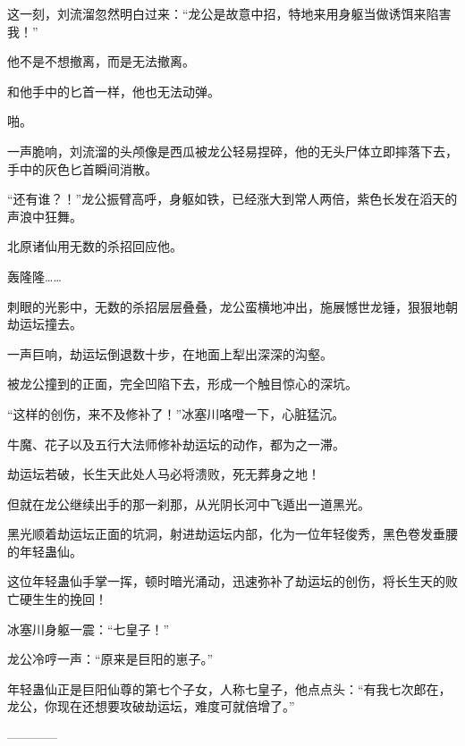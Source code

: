 \begin{this_body}
这一刻，刘流溜忽然明白过来：“龙公是故意中招，特地来用身躯当做诱饵来陷害我！”

他不是不想撤离，而是无法撤离。

和他手中的匕首一样，他也无法动弹。

啪。

一声脆响，刘流溜的头颅像是西瓜被龙公轻易捏碎，他的无头尸体立即摔落下去，手中的灰色匕首瞬间消散。

“还有谁？！”龙公振臂高呼，身躯如铁，已经涨大到常人两倍，紫色长发在滔天的声浪中狂舞。

北原诸仙用无数的杀招回应他。

轰隆隆……

刺眼的光影中，无数的杀招层层叠叠，龙公蛮横地冲出，施展憾世龙锤，狠狠地朝劫运坛撞去。

一声巨响，劫运坛倒退数十步，在地面上犁出深深的沟壑。

被龙公撞到的正面，完全凹陷下去，形成一个触目惊心的深坑。

“这样的创伤，来不及修补了！”冰塞川咯噔一下，心脏猛沉。

牛魔、花子以及五行大法师修补劫运坛的动作，都为之一滞。

劫运坛若破，长生天此处人马必将溃败，死无葬身之地！

但就在龙公继续出手的那一刹那，从光阴长河中飞遁出一道黑光。

黑光顺着劫运坛正面的坑洞，射进劫运坛内部，化为一位年轻俊秀，黑色卷发垂腰的年轻蛊仙。

这位年轻蛊仙手掌一挥，顿时暗光涌动，迅速弥补了劫运坛的创伤，将长生天的败亡硬生生的挽回！

冰塞川身躯一震：“七皇子！”

龙公冷哼一声：“原来是巨阳的崽子。”

年轻蛊仙正是巨阳仙尊的第七个子女，人称七皇子，他点点头：“有我七次郎在，龙公，你现在还想要攻破劫运坛，难度可就倍增了。”

------------

\end{this_body}

